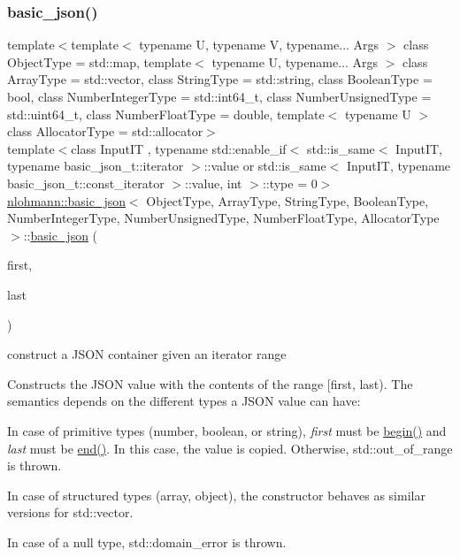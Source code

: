 \subsubsection{\texorpdfstring{basic\+\_\+json()}{basic\_json()}\hspace{0.1cm}{\footnotesize\ttfamily [20/23]}}
{\footnotesize\ttfamily template$<$template$<$ typename U, typename V, typename... Args $>$ class Object\+Type = std\+::map, template$<$ typename U, typename... Args $>$ class Array\+Type = std\+::vector, class String\+Type  = std\+::string, class Boolean\+Type  = bool, class Number\+Integer\+Type  = std\+::int64\+\_\+t, class Number\+Unsigned\+Type  = std\+::uint64\+\_\+t, class Number\+Float\+Type  = double, template$<$ typename U $>$ class Allocator\+Type = std\+::allocator$>$ \\
template$<$class Input\+IT , typename std\+::enable\+\_\+if$<$ std\+::is\+\_\+same$<$ Input\+I\+T, typename basic\+\_\+json\+\_\+t\+::iterator $>$\+::value or std\+::is\+\_\+same$<$ Input\+I\+T, typename basic\+\_\+json\+\_\+t\+::const\+\_\+iterator $>$\+::value, int $>$\+::type  = 0$>$ \\
\hyperlink{classnlohmann_1_1basic__json}{nlohmann\+::basic\+\_\+json}$<$ Object\+Type, Array\+Type, String\+Type, Boolean\+Type, Number\+Integer\+Type, Number\+Unsigned\+Type, Number\+Float\+Type, Allocator\+Type $>$\+::\hyperlink{classnlohmann_1_1basic__json}{basic\+\_\+json} (\begin{DoxyParamCaption}\item[{Input\+IT}]{first,  }\item[{Input\+IT}]{last }\end{DoxyParamCaption})\hspace{0.3cm}{\ttfamily [inline]}}



construct a J\+S\+ON container given an iterator range 

Constructs the J\+S\+ON value with the contents of the range {\ttfamily \mbox{[}first, last)}. The semantics depends on the different types a J\+S\+ON value can have\+:
\begin{DoxyItemize}
\item In case of primitive types (number, boolean, or string), {\itshape first} must be {\ttfamily \hyperlink{classnlohmann_1_1basic__json_ad4e381c54039607be08d7af41a1f6ad1}{begin()}} and {\itshape last} must be {\ttfamily \hyperlink{classnlohmann_1_1basic__json_a12ccf14d39ddae52f6c7e126105a230b}{end()}}. In this case, the value is copied. Otherwise, std\+::out\+\_\+of\+\_\+range is thrown.
\item In case of structured types (array, object), the constructor behaves as similar versions for {\ttfamily std\+::vector}.
\item In case of a null type, std\+::domain\+\_\+error is thrown.
\end{DoxyItemize}


